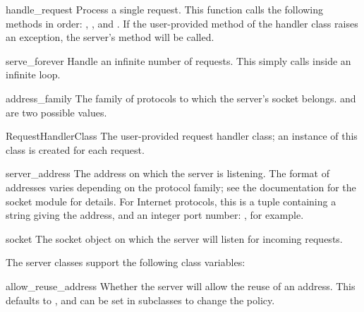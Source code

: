 \begin{funcdesc}{handle_request}{}
Process a single request.  This function calls the following methods
in order: , , and
.  If the user-provided 
method of the handler class raises an exception, the server's
 method will be called.
\end{funcdesc}

\begin{funcdesc}{serve_forever}{}
Handle an infinite number of requests.  This simply calls
 inside an infinite loop.
\end{funcdesc}

\begin{datadesc}{address_family}
The family of protocols to which the server's socket belongs.
 and  are two
possible values.
\end{datadesc}

\begin{datadesc}{RequestHandlerClass}
The user-provided request handler class; an instance of this class is
created for each request.
\end{datadesc}

\begin{datadesc}{server_address}
The address on which the server is listening.  The format of addresses
varies depending on the protocol family; see the documentation for the
socket module for details.  For Internet protocols, this is a tuple
containing a string giving the address, and an integer port number:
, for example.
\end{datadesc}

\begin{datadesc}{socket}
The socket object on which the server will listen for incoming requests.
\end{datadesc}


The server classes support the following class variables:

\begin{datadesc}{allow_reuse_address}
Whether the server will allow the reuse of an address. This defaults
to , and can be set in subclasses to change the policy.
\end{datadesc}

